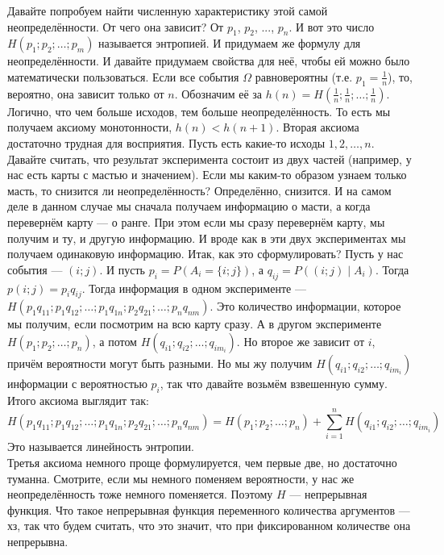 \documentclass{article}
\begin{document}
\begin{itemize}
\begin{Comment}
            Давайте попробуем найти численную характеристику этой самой неопределённости. От чего она зависит? От $p_1$, $p_2$, ..., $p_n$. И вот это число $H(p_1;p_2;\ldots;p_m)$ называется энтропией. И придумаем же формулу для неопределённости. И давайте придумаем свойства для неё, чтобы ей можно было математически пользоваться. Если все события $\Omega$ равновероятны (т.е. $p_1=\frac1n$), то, вероятно, она зависит только от $n$. Обозначим её за $h(n)=H(\frac1n;\frac1n;\ldots;\frac1n)$. Логично, что чем больше исходов, тем больше неопределённость. То есть мы получаем аксиому монотонности, $h(n)<h(n+1)$. Вторая аксиома достаточно трудная для восприятия. Пусть есть какие-то исходы $1,2,\ldots,n$. Давайте считать, что результат эксперимента состоит из двух частей (например, у нас есть карты с мастью и значением). Если мы каким-то образом узнаем только масть, то снизится ли неопределённость? Определённо, снизится. И на самом деле в данном случае мы сначала получаем информацию о масти, а когда перевернём карту --- о ранге. При этом если мы сразу перевернём карту, мы получим и ту, и другую информацию. И вроде как в эти двух экспериментах мы получаем одинаковую информацию. Итак, как это сформулировать? Пусть у нас события --- $(i;j)$. И пусть $p_i=P(A_i=\{i;j\})$, а $q_{ij}=P((i;j)\mid A_i)$. Тогда $p(i;j)=p_iq_{ij}$. Тогда информация в одном эксперименте --- $H(p_1q_{11};p_1q_{12};\ldots;p_1q_{1n};p_2q_{21};\ldots;p_nq_{nm})$. Это количество информации, которое мы получим, если посмотрим на всю карту сразу. А в другом эксперименте $H(p_1;p_2;\ldots;p_n)$, а потом $H(q_{i1};q_{i2};\ldots;q_{im_i})$. Но второе же зависит от $i$, причём вероятности могут быть разными. Но мы жу получим $H(q_{i1};q_{i2};\ldots;q_{im_i})$ информации с вероятностью $p_i$, так что давайте возьмём взвешенную сумму. Итого аксиома выглядит так:
            $$
            H(p_1q_{11};p_1q_{12};\ldots;p_1q_{1n};p_2q_{21};\ldots;p_nq_{nm})=
            H(p_1;p_2;\ldots;p_n)+\sum\limits_{i=1}^nH(q_{i1};q_{i2};\ldots;q_{im_i})
            $$
            Это называется линейность энтропии.\\
            Третья аксиома немного проще формулируется, чем первые две, но достаточно туманна. Смотрите, если мы немного поменяем вероятности, у нас же неопределённость тоже немного поменяется. Поэтому $H$ --- непрерывная функция. Что такое непрерывная функция переменного количества аргументов --- хз, так что будем считать, что это значит, что при фиксированном количестве она непрерывна.
        \end{Comment}
        \begin{Comment}

\end{Comment}
\end{itemize}
\end{document}
